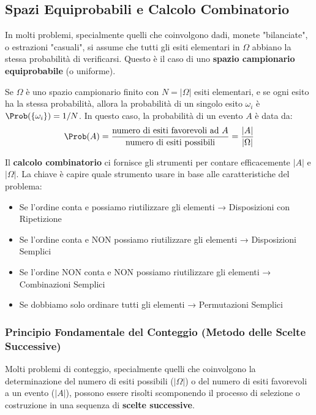\subsection{Spazi Equiprobabili e Calcolo Combinatorio}
In molti problemi, specialmente quelli che coinvolgono dadi, monete "bilanciate", o estrazioni "casuali", si assume che tutti gli esiti elementari in $\Omega$ abbiano la stessa probabilità di verificarsi. Questo è il caso di uno \textbf{spazio campionario equiprobabile} (o uniforme).

Se $\Omega$ è uno spazio campionario finito con $N = |\Omega|$ esiti elementari, e se ogni esito ha la stessa probabilità, allora la probabilità di un singolo esito $\omega_i$ è $\Prob(\{\omega_i\}) = 1/N$.
In questo caso, la probabilità di un evento $A$ è data da:
\[ \Prob(A) = \frac{\text{numero di esiti favorevoli ad } A}{\text{numero di esiti possibili}} = \frac{|A|}{|\Omega|} \]

Il \textbf{calcolo combinatorio} ci fornisce gli strumenti per contare efficacemente $|A|$ e $|\Omega|$. La chiave è capire quale strumento usare in base alle caratteristiche del problema:
\begin{itemize}
    \item Se l'ordine conta e possiamo riutilizzare gli elementi → Disposizioni con Ripetizione
    \item Se l'ordine conta e NON possiamo riutilizzare gli elementi → Disposizioni Semplici
    \item Se l'ordine NON conta e NON possiamo riutilizzare gli elementi → Combinazioni Semplici
    \item Se dobbiamo solo ordinare tutti gli elementi → Permutazioni Semplici
\end{itemize}

\subsubsection{Principio Fondamentale del Conteggio (Metodo delle Scelte Successive)}
\label{subsubsec:principio_moltiplicazione}

Molti problemi di conteggio, specialmente quelli che coinvolgono la determinazione del numero di esiti possibili ($|\Omega|$) o del numero di esiti favorevoli a un evento ($|A|$), possono essere risolti scomponendo il processo di selezione o costruzione in una sequenza di \textbf{scelte successive}.

